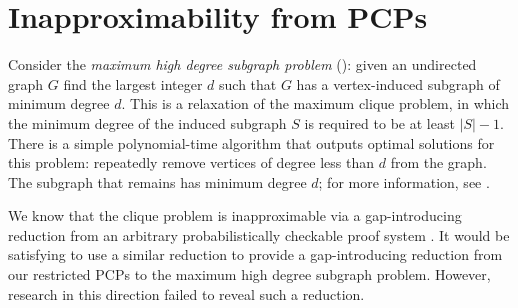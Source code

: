 \section{Inapproximability from PCPs}

Consider the \emph{maximum high degree subgraph problem} (\autocite{am84}): given an undirected graph $G$ find the largest integer $d$ such that $G$ has a vertex-induced subgraph of minimum degree $d$.
This is a relaxation of the maximum clique problem, in which the minimum degree of the induced subgraph $S$ is required to be at least $|S| - 1$.
There is a simple polynomial-time algorithm that outputs optimal solutions for this problem: repeatedly remove vertices of degree less than $d$ from the graph.
The subgraph that remains has minimum degree $d$; for more information, see \autocite[Problem~A.2.7]{ghr95}.

We know that the clique problem is inapproximable via a gap-introducing reduction from an arbitrary probabilistically checkable proof system \autocite{fglss91}.
It would be satisfying to use a similar reduction to provide a gap-introducing reduction from our restricted PCPs to the maximum high degree subgraph problem.
However, research in this direction failed to reveal such a reduction.




